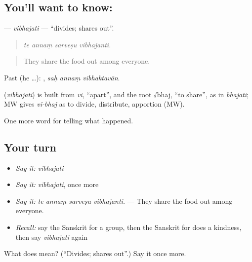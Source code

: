 \subsection*{You'll want to know: }
\textbf{} — \emph{vibhajati} — \textquotedblleft{}divides; shares out\textquotedblright{}.

\begin{quote}
   
\end{quote}

\begin{quote}
\emph{te annaṃ sarveṣu vibhajanti.}
\end{quote}

\begin{quote}
They share the food out among everyone.
\end{quote}

Past (he …):   , \emph{saḥ annaṃ vibhaktavān}.

\begin{cousinweb}
\textbf{} (\emph{vibhajati}) is built from \emph{vi}, \textquotedblleft{}apart\textquotedblright{}, and the root √bhaj, \textquotedblleft{}to share\textquotedblright{}, as in \emph{bhajati}; MW gives \emph{vi-bhaj} as to divide, distribute, apportion (MW).
\end{cousinweb}

\begin{grammarlens}[title={What you've built}]
One more word for telling what happened.
\end{grammarlens}

\subsection*{Your turn}
\begin{itemize}
\raggedright
  \item \emph{Say it:} \emph{vibhajati}
  \item \emph{Say it:} \emph{vibhajati}, once more
  \item \emph{Say it:} \emph{te annaṃ sarveṣu vibhajanti.} — They share the food out among everyone.
  \item \emph{Recall:} say the Sanskrit for a group, then the Sanskrit for does a kindness, then say \emph{vibhajati} again
\end{itemize}

\begin{tcolorbox}[breakable,colback=teal!4,colframe=teal!35!black,title={Before you move on}]
What does  mean? (\textquotedblleft{}Divides; shares out\textquotedblright{}.) Say it once more.
\end{tcolorbox}
